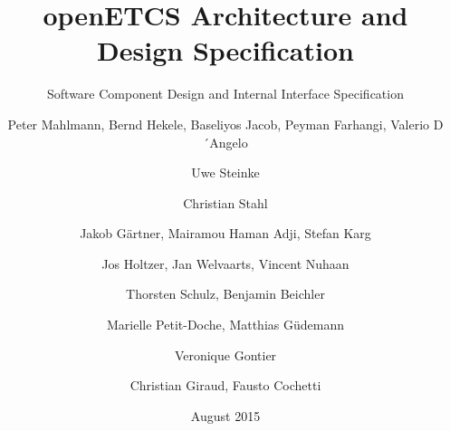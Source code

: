 \documentclass{template/openetcs_report}
\begin{document}
\frontmatter
{}

\newcommand{\define}[1]{\index{#1}\emph{#1}}







\title{openETCS Architecture and Design Specification}

\subtitle{Software Component Design and Internal Interface Specification}

\date{August 2015}








\author{Peter Mahlmann, Bernd Hekele, Baseliyos Jacob, Peyman Farhangi, Valerio D´Angelo}

\author{Uwe Steinke}

\author{Christian Stahl}

\author{Jakob G\"artner, Mairamou Haman Adji, Stefan Karg}

\author{Jos Holtzer, Jan Welvaarts, Vincent Nuhaan}

\author{Thorsten Schulz, Benjamin Beichler}

\author{Marielle Petit-Doche, Matthias G\"udemann}

\author{Veronique Gontier}

\author{Christian Giraud, Fausto Cochetti}
\end{document}
